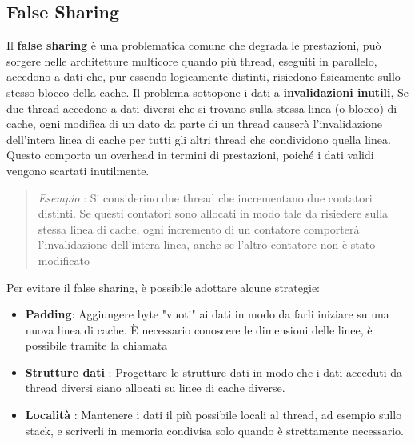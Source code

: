 \documentclass[10pt, letterpaper]{report}
\begin{document}
\subsection{False Sharing}\label{falseSharing}
Il \textbf{false sharing} è una problematica comune che degrada le prestazioni, può sorgere nelle architetture multicore quando più thread, eseguiti in parallelo, accedono a dati che, pur essendo logicamente distinti, risiedono fisicamente sullo stesso blocco della cache.\acc 
Il problema sottopone i dati a \textbf{invalidazioni inutili}, Se due thread accedono a dati diversi che si trovano sulla stessa linea (o blocco) di cache, ogni modifica di un dato da parte di un thread causerà l'invalidazione dell'intera linea di cache per tutti gli altri thread che condividono quella linea. Questo comporta un overhead in termini di prestazioni, poiché i dati validi vengono scartati inutilmente.\begin{quote}
    \textit{Esempio} : Si considerino due thread che incrementano due contatori distinti. Se questi contatori sono allocati in modo tale da risiedere sulla stessa linea di cache, ogni incremento di un contatore comporterà l'invalidazione dell'intera linea, anche se l'altro contatore non è stato modificato
\end{quote}
Per evitare il false sharing, è possibile adottare alcune strategie:
 \begin{itemize}
    \item \textbf{Padding}: Aggiungere byte "vuoti" ai dati in modo da farli iniziare su una nuova linea di cache. È necessario conoscere le dimensioni delle linee, è possibile tramite la chiamata \begin{center}\end{center}
    \item \textbf{Strutture dati} : Progettare le strutture dati in modo che i dati acceduti da thread diversi siano allocati su linee di cache diverse.
    \item \textbf{Località} : Mantenere i dati il più possibile locali al thread, ad esempio sullo stack, e scriverli in memoria condivisa solo quando è strettamente necessario.
\end{itemize}
\end{document}

